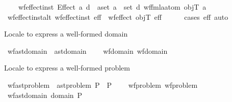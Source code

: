 \begin{isabellebody}
\ \ \ \ {\isachardoublequoteopen}wf{\isacharunderscore}{\kern0pt}effect{\isacharunderscore}{\kern0pt}inst\ {\isacharparenleft}{\kern0pt}Effect\ {\isacharparenleft}{\kern0pt}a{\isacharparenright}{\kern0pt}\ {\isacharparenleft}{\kern0pt}d{\isacharparenright}{\kern0pt}{\isacharparenright}{\kern0pt}\ {\isasymlongleftrightarrow}\ {\isacharparenleft}{\kern0pt}{\isasymforall}a{\isasymin}set\ a\ {\isasymunion}\ set\ d{\isachardot}{\kern0pt}\ wf{\isacharunderscore}{\kern0pt}fmla{\isacharunderscore}{\kern0pt}atom\ objT\ a{\isacharparenright}{\kern0pt}{\isachardoublequoteclose}\isanewline
\isanewline
\ \ \isamarkupfalse%
\ wf{\isacharunderscore}{\kern0pt}effect{\isacharunderscore}{\kern0pt}inst{\isacharunderscore}{\kern0pt}alt{\isacharcolon}{\kern0pt}\ {\isachardoublequoteopen}wf{\isacharunderscore}{\kern0pt}effect{\isacharunderscore}{\kern0pt}inst\ eff\ {\isacharequal}{\kern0pt}\ wf{\isacharunderscore}{\kern0pt}effect\ objT\ eff{\isachardoublequoteclose}\isanewline
%
\isadelimproof
\ \ \ \ %
\endisadelimproof
%
\isatagproof
{}\isamarkupfalse%
\ {\isacharparenleft}{\kern0pt}cases\ eff{\isacharparenright}{\kern0pt}\ auto%
\endisatagproof
{\isafoldproof}%
%
\isadelimproof
\isanewline
%
\endisadelimproof
\isanewline
{}\isamarkupfalse%
\ %
%
\begin{isamarkuptext}%
Locale to express a well-formed domain%
\end{isamarkuptext}\isamarkuptrue%
\isamarkupfalse%
\ wf{\isacharunderscore}{\kern0pt}ast{\isacharunderscore}{\kern0pt}domain\ {\isacharequal}{\kern0pt}\ ast{\isacharunderscore}{\kern0pt}domain\ {\isacharplus}{\kern0pt}\isanewline
\ \ \ wf{\isacharunderscore}{\kern0pt}domain{\isacharcolon}{\kern0pt}\ wf{\isacharunderscore}{\kern0pt}domain%
\begin{isamarkuptext}%
Locale to express a well-formed problem%
\end{isamarkuptext}\isamarkuptrue%
\isamarkupfalse%
\ wf{\isacharunderscore}{\kern0pt}ast{\isacharunderscore}{\kern0pt}problem\ {\isacharequal}{\kern0pt}\ ast{\isacharunderscore}{\kern0pt}problem\ P\ \ P\ {\isacharplus}{\kern0pt}\isanewline
\ \ \ wf{\isacharunderscore}{\kern0pt}problem{\isacharcolon}{\kern0pt}\ wf{\isacharunderscore}{\kern0pt}problem\isanewline
{}\isanewline
\ \ \isamarkupfalse%
\ wf{\isacharunderscore}{\kern0pt}ast{\isacharunderscore}{\kern0pt}domain\ {\isachardoublequoteopen}domain\ P{\isachardoublequoteclose}\isanewline

\end{isabellebody}
